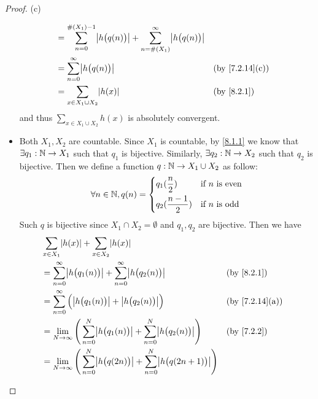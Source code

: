 \begin{proof}{(c)}
\begin{itemize}
\begin{align*}
             & = \sum_{n = 0}^{\#(X_1) - 1} \abs{h\big(q(n)\big)} + \sum_{n = \#(X_1)}^\infty \abs{h\big(q(n)\big)}                                   \\
             & = \sum_{n = 0}^\infty \abs{h\big(q(n)\big)}                                                          &  & \text{(by \cref{7.2.14}(c))} \\
             & = \sum_{x \in X_1 \cup X_2} \abs{h(x)}                                                               &  & \by{8.2.1}
          \end{align*}
          and thus \(\sum_{x \in X_1 \cup X_2} h(x)\) is absolutely convergent.
    \item Both \(X_1, X_2\) are countable.
          Since \(X_1\) is countable, by \cref{8.1.1} we know that \(\exists q_1 : \mathbb{N} \to X_1\) such that \(q_1\) is bijective.
          Similarly, \(\exists q_2 : \mathbb{N} \to X_2\) such that \(q_2\) is bijective.
          Then we define a function \(q : \mathbb{N} \to X_1 \cup X_2\) as follow:
          \[
            \forall n \in \mathbb{N}, q(n) = \begin{dcases}
              q_1(\dfrac{n}{2})     & \text{if } n \text{ is even} \\
              q_2(\dfrac{n - 1}{2}) & \text{if } n \text{ is odd}
            \end{dcases}
          \]
          Such \(q\) is bijective since \(X_1 \cap X_2 = \emptyset\) and \(q_1, q_2\) are bijective.
          Then we have
          \begin{align*}
             & \sum_{x \in X_1} \abs{h(x)} + \sum_{x \in X_2} \abs{h(x)}                                                                                             \\
             & = \sum_{n = 0}^\infty \abs{h\big(q_1(n)\big)} + \sum_{n = 0}^\infty \abs{h\big(q_2(n)\big)}                         &  & \by{8.2.1}                   \\
             & = \sum_{n = 0}^\infty \Big(\abs{h\big(q_1(n)\big)} + \abs{h\big(q_2(n)\big)}\Big)                                   &  & \text{(by \cref{7.2.14}(a))} \\
             & = \lim_{N \to \infty} \Bigg(\sum_{n = 0}^N \abs{h\big(q_1(n)\big)} + \sum_{n = 0}^N \abs{h\big(q_2(n)\big)}\Bigg)   &  & \by{7.2.2}                   \\
             & = \lim_{N \to \infty} \Bigg(\sum_{n = 0}^N \abs{h\big(q(2n)\big)} + \sum_{n = 0}^N \abs{h\big(q(2n + 1)\big)}\Bigg)                                   \\

\end{align*}
\end{itemize}
\end{proof}
